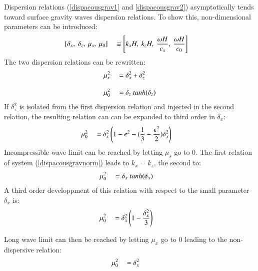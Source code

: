 \documentclass[a4paper,11pt]{article}
\begin{document}
Dispersion relations (\ref{dispacousgrav1} and \ref{dispacousgrav2}) asymptotically tends toward surface gravity waves dispersion relations. To show this, non-dimensional parameters can be introduced:
  \begin{equation}
    \begin{split}
      \displaystyle
      &[\delta_x,\ \delta_z,\ \mu_s,\ \mu_0]
      &&\equiv \left[ k_x H,\ k_z H,\ \frac{\omega H}{c_s},\ \frac{\omega H}{c_0} \right]
    \end{split}
  \end{equation}
  The two dispersion relations can be rewritten:\\
  \begin{equation}
    \label{dispacousgravnorm}
    \begin{split}
      \displaystyle
      &\mu_s^2 &&= \delta_x^2+\delta_z^2\\[3mm]
      &\mu_0^2 &&= \delta_z\ tanh(\delta_z)
    \end{split}
  \end{equation}  
  If $\delta_z^2$ is isolated from the first dispersion relation and injected in the second relation, the resulting relation can can be expanded to third order in $\delta_x$:
     \begin{equation}
    \begin{split}
      \displaystyle
      &\mu_0^2 &&= \delta_x^2 \left( 1-\epsilon^2-(\frac{1}{3}-\frac{\epsilon^2}{2})\delta_x^2 \right)
    \end{split}
  \end{equation}
  Incompressible wave limit can be reached by letting $\mu_s$ go to 0. The first relation of system (\ref{dispacousgravnorm}) leads to $k_x = k_z$, the second to:
   \begin{equation}
    \begin{split}
      \displaystyle
      &\mu_0^2 &&= \delta_x\ tanh(\delta_x)
    \end{split}
  \end{equation}
  A third order developpment of this relation with respect to the small parameter $\delta_x$ is:
   \begin{equation}
    \begin{split}
      \displaystyle
      &\mu_0^2 &&= \delta_x^2 \left( 1-\frac{\delta_x^2}{3} \right)
    \end{split}
  \end{equation}
  
  Long wave limit can then be reached by letting $\mu_x$ go to 0 leading to the non-dispersive relation:
   \begin{equation}
    \begin{split}
      \displaystyle
      &\mu_0^2 &&= \delta_x^2\ 
    \end{split}
  \end{equation}
 
\end{document}
